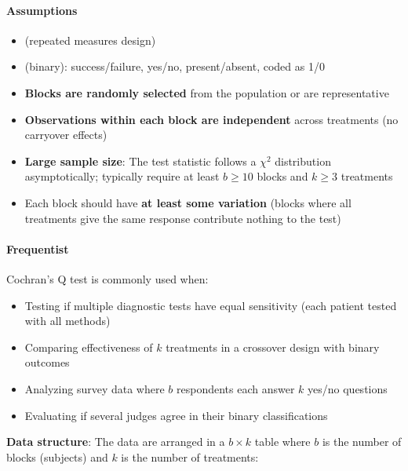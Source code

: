 \paragraph{Assumptions}
\begin{itemize}
    \item {} (repeated measures design)
    \item {} (binary): success/failure, yes/no, present/absent, coded as 1/0
    \item \textbf{Blocks are randomly selected} from the population or are representative
    \item \textbf{Observations within each block are independent} across treatments (no carryover effects)
    \item \textbf{Large sample size}: The test statistic follows a $\chi^2$ distribution asymptotically;
        typically require at least $b \geq 10$ blocks and $k \geq 3$ treatments
    \item Each block should have \textbf{at least some variation} (blocks where all treatments give the
        same response contribute nothing to the test)
\end{itemize}

\paragraph{Frequentist}
Cochran's Q test is commonly used when:
\begin{itemize}
    \item Testing if multiple diagnostic tests have equal sensitivity (each patient tested with all methods)
    \item Comparing effectiveness of $k$ treatments in a crossover design with binary outcomes
    \item Analyzing survey data where $b$ respondents each answer $k$ yes/no questions
    \item Evaluating if several judges agree in their binary classifications
\end{itemize}

\textbf{Data structure}: The data are arranged in a $b \times k$ table where $b$ is the number of
blocks (subjects) and $k$ is the number of treatments:

